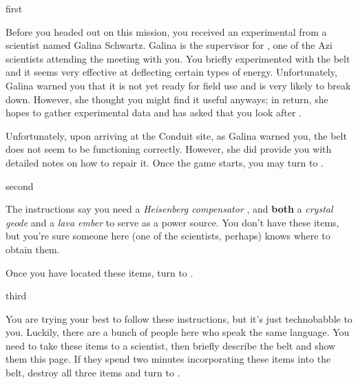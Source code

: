 \documentclass[notebook]{elementals}
\begin{document}

\startnotebook{\nBelt{}}

\begin{page}{first}

Before you headed out on this mission, you received an experimental \iEleBelt{} from a scientist named Galina Schwartz. Galina is the supervisor for \cScientist{\intro}, one of the Azi scientists attending the meeting with you. You briefly experimented with the belt and it seems very effective at deflecting certain types of energy. Unfortunately, Galina warned you that it is not yet ready for field use and is very likely to break down. However, she thought you might find it useful anyways; in return, she hopes to gather experimental data and has asked that you look after \cScientist{}.

Unfortunately, upon arriving at the Conduit site, as Galina warned you, the belt does not seem to be functioning correctly. However, she did provide you with detailed notes on how to repair it. Once the game starts, you may turn to .

\end{page}

\begin{page}{second}

The instructions say you need a \emph{Heisenberg compensator} \iHeisenbergCompensator{\MYnumber}, and {\bf both} a \emph{crystal geode} \iCrystalGeode{\MYnumber} and a \emph{lava ember} \iLavaEmber{\MYnumber} to serve as a power source.  You don't have these items, but you're sure someone here (one of the scientists, perhaps) knows where to obtain them.

Once you have located these items, turn to . 

\end{page}

\begin{page}{third}

You are trying your best to follow these instructions, but it's just technobabble to you. Luckily, there are a bunch of people here who speak the same language. You need to take these items to a scientist, then briefly describe the belt and show them this page. If they spend two minutes incorporating these items into the belt, destroy all three items and turn to .

\end{page}
\end{document}
